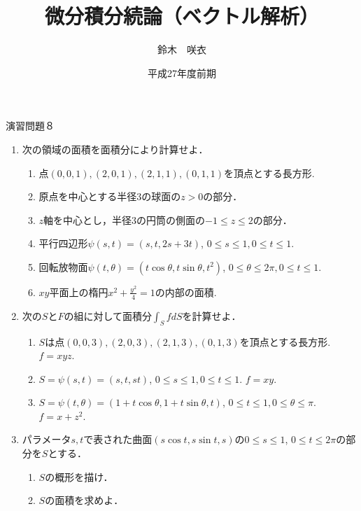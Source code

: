 \documentclass{jarticle}
\begin{document}
\title{微分積分続論（ベクトル解析）} 
\author{鈴木　咲衣}
\date{平成27年度前期}
\maketitle

\begin{center} {\Large 演習問題８ } \end{center}
\begin{enumerate}
\item \cite[練習問題4.9, 4.11, 章末問題4.5]{koba} 次の領域の面積を面積分により計算せよ．
\begin{enumerate}
\item 点$(0,0,1), (2,0,1),(2,1,1), (0,1,1)$を頂点とする長方形.
\item 原点を中心とする半径$3$の球面の$z>0$の部分．
\item $z$軸を中心とし，半径$3$の円筒の側面の$-1\leq z\leq 2$の部分．
\item 平行四辺形$\psi(s,t)=(s,t,2s+3t)$, $0\leq s\leq 1, 0\leq t\leq 1$.
\item 回転放物面$\psi(t, \theta)=(t\cos \theta,t\sin \theta, t^{2})$, $0\leq \theta \leq 2\pi, 0\leq t\leq 1$.
\item $xy$平面上の楕円$x^{2}+\frac{y^{2}}{4}=1$の内部の面積.
\end{enumerate}
\item \cite[章末問題4.6]{koba} 次の$S$と$F$の組に対して面積分$\int_{S}f dS$を計算せよ．
\begin{enumerate}
\item $S$は点$(0,0,3), (2,0,3),(2,1,3), (0,1,3)$を頂点とする長方形. $f=xyz$.
\item $S=\psi(s,t)=(s,t,st)$, $0\leq s\leq 1, 0\leq t\leq 1$. $f=xy$.
\item  $S=\psi(t,\theta)=(1+t\cos \theta ,1+t\sin \theta, t)$, $0\leq t\leq 1, 0\leq \theta \leq \pi$. $f=x+z^{2}$.
\end{enumerate}
\item  \cite[章末問題4.7]{koba} パラメータ$s,t$で表された曲面$(s\cos t, s\sin t, s)$の$0\leq s \leq 1$, $0\leq t\leq 2\pi$の部分を$S$とする．
\begin{enumerate}
\item $S$の概形を描け．
\item $S$の面積を求めよ．
\end{enumerate}
\end{enumerate}

\newpage
\end{document}
